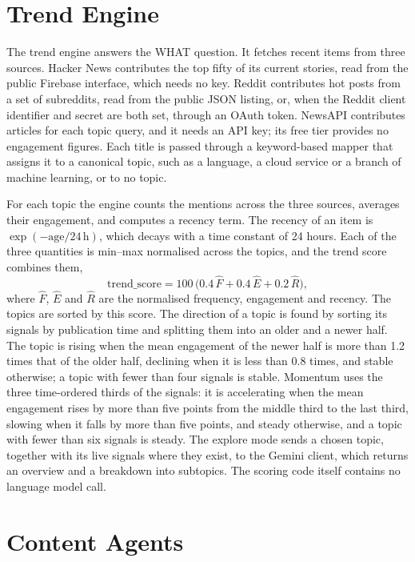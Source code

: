 \section{Trend Engine}
\label{sec:axiom-trends}

The trend engine answers the WHAT question. It fetches recent items from three sources. Hacker News contributes the top fifty of its current stories, read from the public Firebase interface, which needs no key. Reddit contributes hot posts from a set of subreddits, read from the public JSON listing, or, when the Reddit client identifier and secret are both set, through an OAuth token. NewsAPI contributes articles for each topic query, and it needs an API key; its free tier provides no engagement figures. Each title is passed through a keyword-based mapper that assigns it to a canonical topic, such as a language, a cloud service or a branch of machine learning, or to no topic.

For each topic the engine counts the mentions across the three sources, averages their engagement, and computes a recency term. The recency of an item is $\exp(-\text{age}/24\,\mathrm{h})$, which decays with a time constant of 24 hours. Each of the three quantities is min--max normalised across the topics, and the trend score combines them,
\begin{equation}
  \mathrm{trend\_score} = 100\,\bigl(0.4\,\hat{F} + 0.4\,\hat{E} + 0.2\,\hat{R}\bigr),
  \label{eq:axiom-trend}
\end{equation}
where $\hat{F}$, $\hat{E}$ and $\hat{R}$ are the normalised frequency, engagement and recency. The topics are sorted by this score. The direction of a topic is found by sorting its signals by publication time and splitting them into an older and a newer half. The topic is rising when the mean engagement of the newer half is more than 1.2 times that of the older half, declining when it is less than 0.8 times, and stable otherwise; a topic with fewer than four signals is stable. Momentum uses the three time-ordered thirds of the signals: it is accelerating when the mean engagement rises by more than five points from the middle third to the last third, slowing when it falls by more than five points, and steady otherwise, and a topic with fewer than six signals is steady. The explore mode sends a chosen topic, together with its live signals where they exist, to the Gemini client, which returns an overview and a breakdown into subtopics. The scoring code itself contains no language model call.

\section{Content Agents}
\label{sec:axiom-agents}

